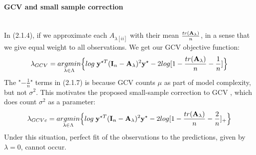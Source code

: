 \documentclass[11pt]{article}
\begin{document}
\paragraph{GCV and small sample correction}\mbox{}\\
In (2.1.4), if we approximate each $A_{\lambda[ii]}$ with their mean $\frac{tr({\bf A}_\lambda)}{n}$, in a sense that we give equal weight to all observations. We get our GCV objective function:
\begin{align}
\lambda_{GCV}=\underset{\lambda \in \Lambda}{argmin}\Big\{log\; {\bf y}^{\star T}({\bf I}_n-{\bf A}_\lambda)^2{\bf y}^\star-2log[1-\frac{tr({\bf A}_\lambda)}{n}-\frac{1}{n}]\Big\}
\end{align}
The "$-\frac{1}{n}$" terms in (2.1.7) is because GCV counts $\mu$ as part of model complexity, but not $\sigma^2$. This motivates the proposed small-sample correction to GCV \citep{boonstra_small-sample_2015}, which does count $\sigma^2$ as a parameter:
\begin{align}
\lambda_{GCVc}=\underset{\lambda \in \Lambda}{argmin}\Big\{log\; {\bf y}^{\star T}({\bf I}_n-{\bf A}_\lambda)^2{\bf y}^\star-2log[1-\frac{tr({\bf A}_\lambda)}{n}-\frac{2}{n}]_+\Big\}
\end{align}
Under this situation, perfect fit of the observations to the predictions, given by $\lambda=0$, cannot occur.
\end{document}
